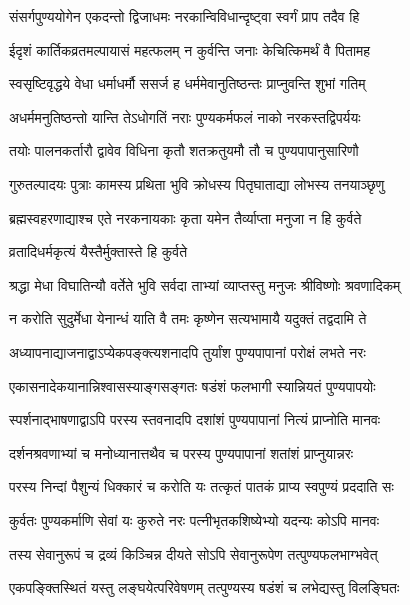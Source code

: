 \twolineshloka
{संसर्गपुण्ययोगेन एकदन्तो द्विजाधमः}
{नरकान्विविधान्दृष्ट्वा स्वर्गं प्राप तदैव हि} %


\twolineshloka
{ईदृशं कार्तिकव्रतमल्पायासं महत्फलम्}
{न कुर्वन्ति जनाः केचित्किमर्थं वै पितामह} %


\twolineshloka
{स्वसृष्टिवृद्धये वेधा धर्माधर्मौ ससर्ज ह}
{धर्ममेवानुतिष्ठन्तः प्राप्नुवन्ति शुभां गतिम्} %

\twolineshloka
{अधर्ममनुतिष्ठन्तो यान्ति तेऽधोगतिं नराः}
{पुण्यकर्मफलं नाको नरकस्तद्विपर्ययः} %

\twolineshloka
{तयोः पालनकर्तारौ द्वावेव विधिना कृतौ}
{शतक्रतुयमौ तौ च पुण्यपापानुसारिणौ} %

\twolineshloka
{गुरुतल्पादयः पुत्राः कामस्य प्रथिता भुवि}
{क्रोधस्य पितृघाताद्या लोभस्य तनयाञ्छृणु} %

\twolineshloka
{ब्रह्मस्वहरणाद्याश्च एते नरकनायकाः}
{कृता यमेन तैर्व्याप्ता मनुजा न हि कुर्वते} %


\onelineshloka
{व्रतादिधर्मकृत्यं यैस्तैर्मुक्तास्ते हि कुर्वते} %

\twolineshloka
{श्रद्धा मेधा विघातिन्यौ वर्तेते भुवि सर्वदा}
{ताभ्यां व्याप्तस्तु मनुजः श्रीविष्णोः श्रवणादिकम्} %

\twolineshloka
{न करोति सुदुर्मेधा येनान्धं याति वै तमः}
{कृष्णेन सत्यभामायै यदुक्तं तद्वदामि ते} %

\twolineshloka
{अध्यापनाद्याजनाद्वाऽप्येकपङ्क्त्यशनादपि}
{तुर्यांश पुण्यपापानां परोक्षं लभते नरः} %

\twolineshloka
{एकासनादेकयानान्निश्वासस्याङ्गसङ्गतः}
{षडंशं फलभागी स्यान्नियतं पुण्यपापयोः} %

\twolineshloka
{स्पर्शनाद्भाषणाद्वाऽपि परस्य स्तवनादपि}
{दशांशं पुण्यपापानां नित्यं प्राप्नोति मानवः} %

\twolineshloka
{दर्शनश्रवणाभ्यां च मनोध्यानात्तथैव च}
{परस्य पुण्यपापानां शतांशं प्राप्नुयान्नरः} %

\twolineshloka
{परस्य निन्दां पैशुन्यं धिक्कारं च करोति यः}
{तत्कृतं पातकं प्राप्य स्वपुण्यं प्रददाति सः} %

\twolineshloka
{कुर्वतः पुण्यकर्माणि सेवां यः कुरुते नरः}
{पत्नीभृतकशिष्येभ्यो यदन्यः कोऽपि मानवः} %

\twolineshloka
{तस्य सेवानुरूपं च द्रव्यं किञ्चिन्न दीयते}
{सोऽपि सेवानुरूपेण तत्पुण्यफलभाग्भवेत्} %

\twolineshloka
{एकपङ्क्तिस्थितं यस्तु लङ्घयेत्परिवेषणम्}
{तत्पुण्यस्य षडंशं च लभेद्यस्तु विलङ्घितः} %

